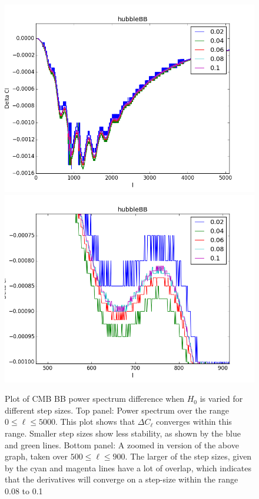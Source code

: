 \begin{figure}[tbhp]
\centering
\includegraphics[scale=0.6]{images/diffs/H0bb.png}
\includegraphics[scale=0.6]{images/diffs/H0bbz.png}
\caption{Plot of CMB BB power spectrum difference when $H_{0}$ is varied for different step sizes. Top panel: Power spectrum over the range $0 \leq \ell \leq 5000$. This plot shows that $\Delta C_{\ell}$ converges within this range. Smaller step sizes show less stability, as shown by the blue and green lines. Bottom panel: A zoomed in version of the above graph, taken over $500 \leq \ell \leq 900$. The larger of the step sizes, given by the cyan and magenta lines have a lot of overlap, which indicates that the derivatives will converge on a step-size within the range 0.08 to 0.1}
\label{fig:diffH0}
\end{figure}

